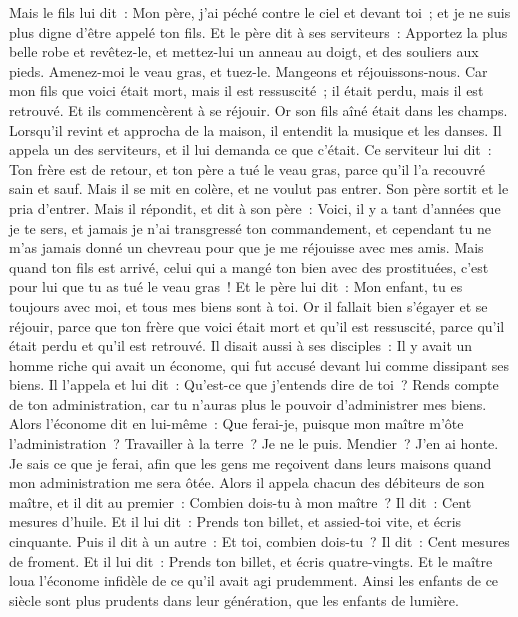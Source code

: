 \begin{multicols}{2}
Mais le fils lui dit~: Mon père, j'ai péché contre le ciel et devant toi~; et je ne suis plus digne d'être appelé ton fils.
Et le père dit à ses serviteurs~: Apportez la plus belle robe et revêtez-le, et mettez-lui un anneau au doigt, et des souliers aux pieds.
Amenez-moi le veau gras, et tuez-le. Mangeons et réjouissons-nous.
Car mon fils que voici était mort, mais il est ressuscité~; il était perdu, mais il est retrouvé. Et ils commencèrent à se réjouir.
Or son fils aîné était dans les champs. Lorsqu'il revint et approcha de la maison, il entendit la musique et les danses.
Il appela un des serviteurs, et il lui demanda ce que c'était.
Ce serviteur lui dit~: Ton frère est de retour, et ton père a tué le veau gras, parce qu'il l'a recouvré sain et sauf.
Mais il se mit en colère, et ne voulut pas entrer. Son père sortit et le pria d'entrer.
Mais il répondit, et dit à son père~: Voici, il y a tant d'années que je te sers, et jamais je n'ai transgressé ton commandement, et cependant tu ne m'as jamais donné un chevreau pour que je me réjouisse avec mes amis.
Mais quand ton fils est arrivé, celui qui a mangé ton bien avec des prostituées, c'est pour lui que tu as tué le veau gras~!
Et le père lui dit~: Mon enfant, tu es toujours avec moi, et tous mes biens sont à toi.
Or il fallait bien s'égayer et se réjouir, parce que ton frère que voici était mort et qu'il est ressuscité, parce qu'il était perdu et qu'il est retrouvé.
\VerseOne{}Il disait aussi à ses disciples~: Il y avait un homme riche qui avait un économe, qui fut accusé devant lui comme dissipant ses biens.
Il l'appela et lui dit~: Qu'est-ce que j'entends dire de toi~? Rends compte de ton administration, car tu n'auras plus le pouvoir d'administrer mes biens.
Alors l'économe dit en lui-même~: Que ferai-je, puisque mon maître m'ôte l'administration~? Travailler à la terre~? Je ne le puis. Mendier~? J'en ai honte.
Je sais ce que je ferai, afin que les gens me reçoivent dans leurs maisons quand mon administration me sera ôtée.
Alors il appela chacun des débiteurs de son maître, et il dit au premier~: Combien dois-tu à mon maître~?
Il dit~: Cent mesures d'huile. Et il lui dit~: Prends ton billet, et assied-toi vite, et écris cinquante.
Puis il dit à un autre~: Et toi, combien dois-tu~? Il dit~: Cent mesures de froment. Et il lui dit~: Prends ton billet, et écris quatre-vingts.
Et le maître loua l'économe infidèle de ce qu'il avait agi prudemment. Ainsi les enfants de ce siècle sont plus prudents dans leur génération, que les enfants de lumière.

\end{multicols}
